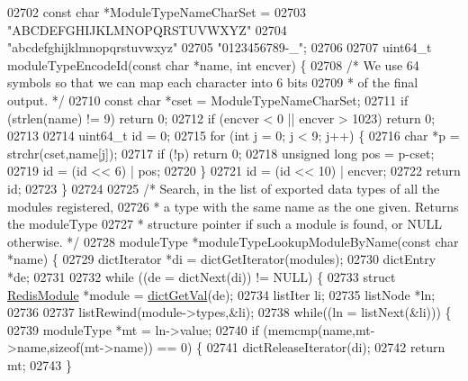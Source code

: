 \begin{DoxyCode}
{{{02702 \textcolor{keyword}{const} \textcolor{keywordtype}{char} *ModuleTypeNameCharSet =
02703              \textcolor{stringliteral}{"ABCDEFGHIJKLMNOPQRSTUVWXYZ"}
02704              \textcolor{stringliteral}{"abcdefghijklmnopqrstuvwxyz"}
02705              \textcolor{stringliteral}{"0123456789-\_"};
02706 
02707 uint64\_t moduleTypeEncodeId(\textcolor{keyword}{const} \textcolor{keywordtype}{char} *name, \textcolor{keywordtype}{int} encver) \{
02708     \textcolor{comment}{/* We use 64 symbols so that we can map each character into 6 bits}
02709 \textcolor{comment}{     * of the final output. */}
02710     \textcolor{keyword}{const} \textcolor{keywordtype}{char} *cset = ModuleTypeNameCharSet;
02711     \textcolor{keywordflow}{if} (strlen(name) != 9) \textcolor{keywordflow}{return} 0;
02712     \textcolor{keywordflow}{if} (encver < 0 || encver > 1023) \textcolor{keywordflow}{return} 0;
02713 
02714     uint64\_t id = 0;
02715     \textcolor{keywordflow}{for} (\textcolor{keywordtype}{int} j = 0; j < 9; j++) \{
02716         \textcolor{keywordtype}{char} *p = strchr(cset,name[j]);
02717         \textcolor{keywordflow}{if} (!p) \textcolor{keywordflow}{return} 0;
02718         \textcolor{keywordtype}{unsigned} \textcolor{keywordtype}{long} pos = p-cset;
02719         id = (id << 6) | pos;
02720     \}
02721     id = (id << 10) | encver;
02722     \textcolor{keywordflow}{return} id;
02723 \}
02724 
02725 \textcolor{comment}{/* Search, in the list of exported data types of all the modules registered,}
02726 \textcolor{comment}{ * a type with the same name as the one given. Returns the moduleType}
02727 \textcolor{comment}{ * structure pointer if such a module is found, or NULL otherwise. */}
02728 moduleType *moduleTypeLookupModuleByName(\textcolor{keyword}{const} \textcolor{keywordtype}{char} *name) \{
02729     dictIterator *di = dictGetIterator(modules);
02730     dictEntry *de;
02731 
02732     \textcolor{keywordflow}{while} ((de = dictNext(di)) != NULL) \{
02733         \textcolor{keyword}{struct} \hyperlink{structRedisModule}{RedisModule} *module = \hyperlink{dict_8h_ae8d2cc391873b2bea2b87c4f80f43120}{dictGetVal}(de);
02734         listIter li;
02735         listNode *ln;
02736 
02737         listRewind(module->types,&li);
02738         \textcolor{keywordflow}{while}((ln = listNext(&li))) \{
02739             moduleType *mt = ln->value;
02740             \textcolor{keywordflow}{if} (memcmp(name,mt->name,\textcolor{keyword}{sizeof}(mt->name)) == 0) \{
02741                 dictReleaseIterator(di);
02742                 \textcolor{keywordflow}{return} mt;
02743             \}
}}}
\end{DoxyCode}
